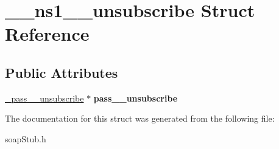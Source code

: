 \hypertarget{struct____ns1____unsubscribe}{
\section{\_\-\_\-ns1\_\-\_\-unsubscribe Struct Reference}
\label{struct____ns1____unsubscribe}
}
\subsection*{Public Attributes}
\begin{DoxyCompactItemize}
\item 
\hypertarget{struct____ns1____unsubscribe_a97b331416d503e2fe9f9b7e06b15a5ff}{
\hyperlink{class__pass____unsubscribe}{\_\-pass\_\-\_\-unsubscribe} $\ast$ {\bfseries pass\_\-\_\-unsubscribe}}
\label{struct____ns1____unsubscribe_a97b331416d503e2fe9f9b7e06b15a5ff}

\end{DoxyCompactItemize}


The documentation for this struct was generated from the following file:\begin{DoxyCompactItemize}
\item 
soapStub.h\end{DoxyCompactItemize}
